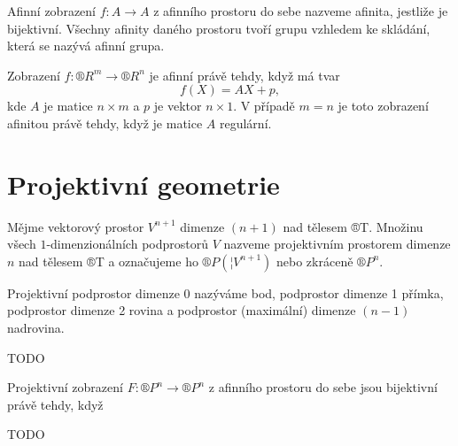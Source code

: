 \documentclass[12pt]{article}					%
\begin{document}
\begin{definice}[Afinita]
	Afinní zobrazení $f: A \rightarrow A$ z afinního prostoru do sebe nazveme afinita, jestliže je bijektivní. Všechny afinity daného prostoru tvoří grupu vzhledem ke skládání, která se nazývá afinní grupa.
\end{definice}

\begin{veta}
	Zobrazení $f: ®R^m \rightarrow ®R^n$ je afinní právě tehdy, když má tvar
	$$ f(X) = A X + p, $$
	kde $A$ je matice $n \times m$ a $p$ je vektor $n \times 1$. V případě $m = n$ je toto zobrazení afinitou právě tehdy, když je matice $A$ regulární.
\end{veta}

\section{Projektivní geometrie}
\begin{definice}
	Mějme vektorový prostor $V^{n+1}$ dimenze $(n+1)$ nad tělesem ®T. Množinu všech $1$-dimenzionálních podprostorů $V$ nazveme projektivním prostorem dimenze $n$ nad tělesem ®T a označujeme ho $®P(¦V^{n+1})$ nebo zkráceně $®P^n$.

	Projektivní podprostor dimenze 0 nazýváme bod, podprostor dimenze 1 přímka, podprostor dimenze 2 rovina a podprostor (maximální) dimenze $(n-1)$ nadrovina.
\end{definice}

TODO

\begin{veta}
	Projektivní zobrazení $F: ®P^n \rightarrow ®P^n$ z afinního prostoru do sebe jsou bijektivní právě tehdy, když
\end{veta}

TODO
\end{document}

